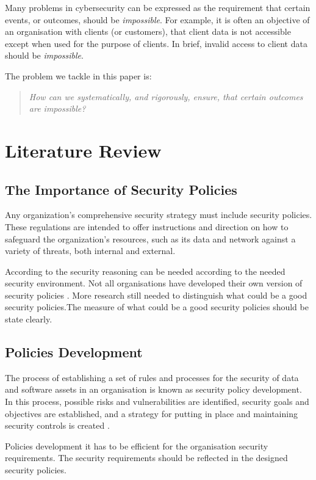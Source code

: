 \documentclass[journal]{IEEEtran}
\begin{document}
Many problems in cybersecurity can be expressed as the requirement that certain
events, or outcomes, should be {\em impossible}.
For example, it is often an objective of an organisation with clients (or
customers), that client data is not accessible except when used for the purpose
of clients. In brief, invalid access to client data should be {\em impossible}.

The problem we tackle in this paper is:
\begin{quote}\em
  How can we systematically, and rigorously, ensure, that
  certain outcomes are impossible?
\end{quote}


\section{Literature Review}

\subsection{The Importance of Security Policies}
Any organization's comprehensive security strategy must include
security policies. These regulations are intended to offer instructions
and direction on how to safeguard the organization's resources,
such as its data and network against a variety of threats,
both internal and external.

According to \cite{glasgow1992logic}\cite{UchenduBetsy2021Dacs} the security reasoning can
be needed according to the needed security environment.  Not all
organisations have developed their own version of security policies
\cite{paananen2020state}. More research still needed to distinguish what
could be a good security policies.The measure of what could be a good
security policies should be state clearly.

\subsection{Policies Development}
The process of establishing a set of rules and processes for the security
of data and software assets in an organisation is known as security policy development.
In this process, possible risks and vulnerabilities are identified, security
goals and objectives are established, and a strategy for putting in place
and maintaining security controls is created \cite{Hanna2023}.

Policies development it has to be efficient for the organisation security
requirements. The security requirements should be reflected in the
designed security policies.
\end{document}
